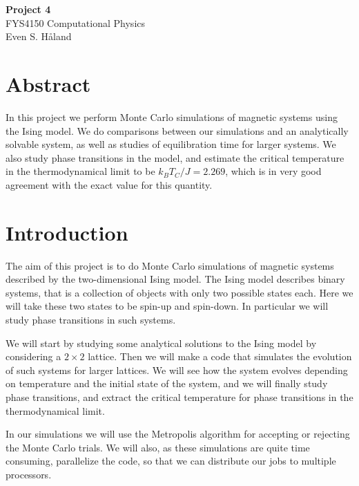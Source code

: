 \documentclass[12pt, a4paper]{article}
\begin{document}
\begin{titlepage}
\begin{center}
\vspace*{3cm}
\Huge
\textbf{Project 4} \\
\Large  
FYS4150 Computational Physics 
\vspace*{3cm} \\ 

Even S. Håland 
\vspace*{5cm} \\

\normalsize
\section*{Abstract}

In this project we perform Monte Carlo simulations of magnetic systems using the Ising model. We do 
comparisons between our simulations and an analytically solvable system, as well as studies of 
equilibration time for larger systems. We also study phase transitions in the model, and estimate 
the critical temperature in the thermodynamical limit to be $k_BT_C/J=2.269$, which is in very good 
agreement with the exact value for this quantity. 

\end{center}
\end{titlepage}

\section{Introduction}

The aim of this project is to do Monte Carlo simulations of magnetic systems described by the 
two-dimensional Ising model. The Ising model describes binary systems, that is a collection of objects 
with only two possible states each. Here we will take these two states to be spin-up and spin-down. In
particular we will study phase transitions in such systems. 

We will start by studying some analytical solutions to the Ising model by considering a $2\times 2$ 
lattice. Then we will make a code that simulates the evolution of such systems for larger lattices. We 
will see how the system evolves depending on temperature and the initial state of the system, and we 
will finally study phase transitions, and extract the critical temperature for phase transitions in 
the thermodynamical limit.  

In our simulations we will use the Metropolis algorithm for accepting or rejecting the Monte Carlo 
trials. We will also, as these simulations are quite time consuming, parallelize the code, so that 
we can distribute our jobs to multiple processors. 
\end{document}
